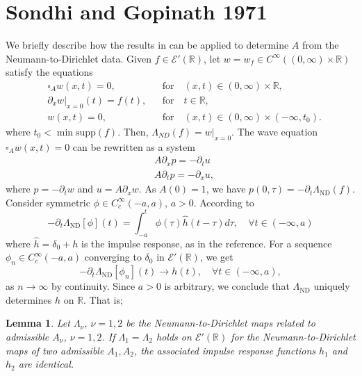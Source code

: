 \documentclass[10pt,a4paper]{article}
\theoremstyle{plain}
\newtheorem{lemma}[theorem]{Lemma}
\theoremstyle{definition}
\theoremstyle{remark}
\numberwithin{equation}{section}
\newcommand{\R}{\mathbb{R}}
\newcommand{\ND}{\Lambda_{\text{ND}}}
\begin{document}

\section{Sondhi and Gopinath 1971}\label{sondhi_app}

We briefly describe  how the results in \cite{sondhi_gopinath} can be applied to determine $A$ from the Neumann-to-Dirichlet data. 
Given $f  \in  \mathcal{E}'(\R)  $, let $w= w_f \in C^\infty( (0,\infty) \times \R) $ satisfy the equations 
\begin{align}
 & \square_A w (x,t)  = 0,  && \text{for} \quad (x,t) \in    (0,\infty) \times \R ,\label{Atr:eq:wave-u}\\
 & \partial_x w |_{x=0} (t)  =  f(t), &&\text{for} \quad  t \in \R,\label{Atr:eq:neumann-u}\\
 & w (x,t)= 0, &&\text{for} \quad (x,t) \in (0,\infty) \times (- \infty, t_0 ) .\label{Atr:eq:initial-u}
\end{align} 
where $t_0 <  \min \text{supp} (f)$.
Then, $\Lambda_{ND} ( f ) = w |_{x=0}$. 
The wave equation $\square_A w (x,t)  = 0$ can be rewritten as a system
\begin{align}
&A \partial_x p = - \partial_t u \label{kkokk12} \\
&A \partial_t p = - \partial_x u, \label{kokk122}
\end{align}
where $p = -\partial_t w$ and $u =  A \partial_x w$.
As $A(0) =1$, we have $p (0, \tau)  = - \partial_t \ND( f)$. Consider symmetric $\phi \in C^\infty_c( -a, a)$, $a>0$.  
According to \cite[eq. (5)]{sondhi_gopinath}
\[
 - \partial_t \ND[ \phi]  (t) = \int_{-a }^t \phi(\tau) \hat{h}(t-\tau) d\tau, \quad \forall t \in (-\infty ,a)
\]
where $\hat{h} = \delta_0 + h$ is the impulse response, as in the reference. 
For a sequence $\phi_n \in C^\infty_c  (-a,a) $ converging  to $\delta_0$ in $\mathcal{E}'(\R)$, we get 
\[
 - \partial_t \ND[ \phi_n]  (t)  \to   h(t), \quad \forall t \in (-\infty,a),
\]
as $n \to \infty$ by continuity. Since $a>0$ is arbitrary, we conclude that $\ND$ uniquely determines $h$ on $\R$. That is;
\begin{lemma}\label{sondhi_lemma}
Let $\Lambda_\nu$, $\nu =1,2$ be the Neumann-to-Dirichlet maps related to admissible $A_\nu$, $\nu =1,2$. 
If $\Lambda_{1} = \Lambda_{2}$  holds on $\mathcal{E}'(\R)$ for the Neumann-to-Dirichlet maps of two admissible $A_1,A_2$, the associated impulse response functions $h_1$ and $h_2$ are identical. 
\end{lemma}
\end{document}
